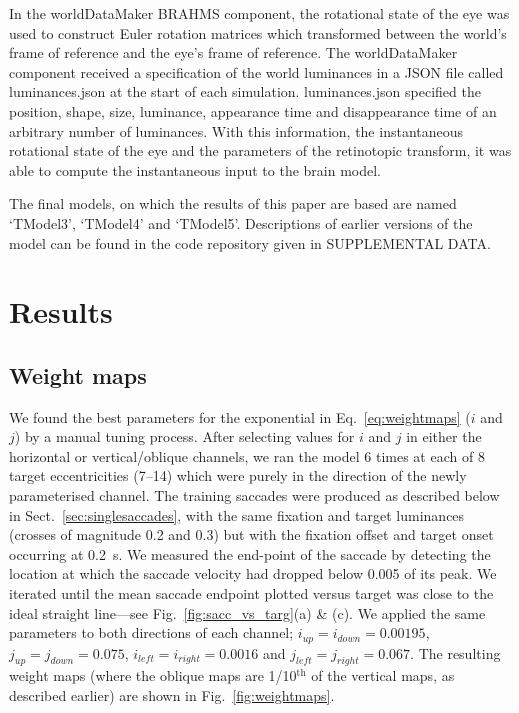 \documentclass{frontiersSCNS}
\begin{document}
In the worldDataMaker BRAHMS component, the rotational state of the
eye was used to construct Euler rotation matrices which transformed
between the world's frame of reference and the eye's frame of
reference. The worldDataMaker component received a specification of
the world luminances in a JSON file called luminances.json at the
start of each simulation. luminances.json specified the position,
shape, size, luminance, appearance time and disappearance time of an
arbitrary number of luminances. With this information, the
instantaneous rotational state of the eye and the parameters of the
retinotopic transform, it was able to compute the instantaneous input
to the brain model.

The final models, on which the results of this paper are based are
named `TModel3', `TModel4' and `TModel5'. Descriptions of earlier
versions of the model can be
found in the code repository given in SUPPLEMENTAL DATA.


\section{Results}

%

\subsection{Weight maps}

We found the best parameters for the exponential in Eq.~\ref{eq:weightmaps}
($i$ and $j$) by a manual tuning process. After selecting values for $i$ and $j$
in either the horizontal or vertical/oblique channels, we ran the model 6 times
at each of 8 target eccentricities (7\dg--14\dg) which were purely
in the direction of the
newly parameterised channel. The training saccades were produced as described below in
Sect.~\ref{sec:singlesaccades}, with the same fixation and target luminances
(crosses of magnitude 0.2 and 0.3) but with
the fixation offset and target onset occurring at 0.2~s. We measured the end-point
of the saccade by
detecting the location at which the saccade velocity had dropped below
0.005 of its peak. We iterated until the mean saccade endpoint plotted versus target
was close to the ideal straight line---see Fig.~\ref{fig:sacc_vs_targ}(a) \& (c). We
applied the same parameters to both directions of each channel;
$i_{up} = i_{down} = 0.00195$, $j_{up} = j_{down} = 0.075$,
$i_{left} = i_{right} = 0.0016$ and $j_{left} = j_{right} = 0.067$. The resulting
weight maps (where the oblique maps are 1/10$^{\mathrm{th}}$ of the vertical maps,
as described earlier) are shown in Fig.~\ref{fig:weightmaps}.
\end{document}
